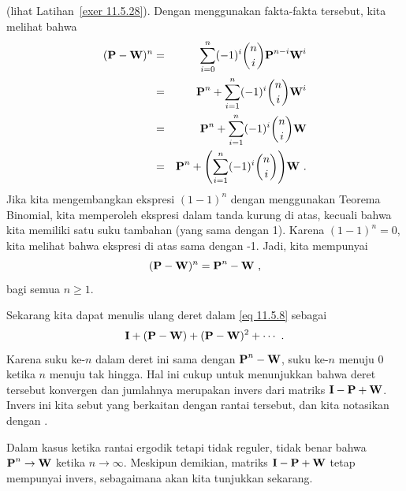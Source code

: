 (lihat Latihan~\ref{exer 11.5.28}). Dengan menggunakan fakta-fakta tersebut, kita
melihat bahwa
\begin{eqnarray*}
({\mbox{\bf P}\/} - {\mbox{\bf W}\/})^n &=& \sum_{i = 0}^n (-1)^i{n \choose i}{\mbox{\bf P}\/}^{n-i}{\mbox{\bf W}\/}^i \\
&=& {\mbox{\bf P}\/}^n + \sum_{i = 1}^n (-1)^i{n \choose i} {\mbox{\bf W}\/}^i \\
&=& {\mbox{\bf P}\/}^n + \sum_{i = 1}^n (-1)^i{n \choose i} {\mbox{\bf W}\/} \\
&=& {\mbox{\bf P}\/}^n + \Biggl(\sum_{i = 1}^n (-1)^i{n \choose i}\Biggr) {\mbox{\bf W}\/}\ .
\end{eqnarray*}
Jika kita mengembangkan ekspresi $(1-1)^n$ dengan menggunakan Teorema Binomial,
kita memperoleh ekspresi dalam tanda kurung di atas, kecuali bahwa kita memiliki
satu suku tambahan (yang sama dengan 1). Karena $(1-1)^n = 0$, kita melihat bahwa
ekspresi di atas sama dengan -1. Jadi, kita mempunyai
$$({\mbox{\bf P}\/} - {\mbox{\bf W}\/})^n = {\mbox{\bf P}\/}^n - {\mbox{\bf W}\/}\ ,$$
bagi semua $n \ge 1$.
\par
Sekarang kita dapat menulis ulang deret dalam \ref{eq 11.5.8} sebagai
$${\mbox{\bf I}\/} + ({\mbox{\bf P}\/} - {\mbox{\bf W}\/}) + ({\mbox{\bf P}\/} - {\mbox{\bf W}\/})^2 + \cdots\ .$$
Karena suku ke-$n$ dalam deret ini sama dengan ${\mbox{\bf P}\/}^n - {\mbox{\bf W}\/}$, suku
ke-$n$ menuju 0 ketika $n$ menuju tak hingga. Hal ini cukup untuk menunjukkan
bahwa deret tersebut konvergen dan jumlahnya merupakan invers dari matriks
${\mbox{\bf I}\/} - {\mbox{\bf P}\/} + {\mbox{\bf W}\/}$. Invers ini kita sebut  yang berkaitan dengan rantai tersebut, dan kita notasikan dengan
.
\par
Dalam kasus ketika rantai ergodik tetapi tidak reguler, tidak benar bahwa
${\mbox{\bf P}\/}^n \rightarrow {\mbox{\bf W}\/}$ ketika $n \rightarrow \infty$. Meskipun
demikian, matriks ${\mbox{\bf I}\/} - {\mbox{\bf P}\/} + {\mbox{\bf W}\/}$ tetap mempunyai invers,
sebagaimana akan kita tunjukkan sekarang.

